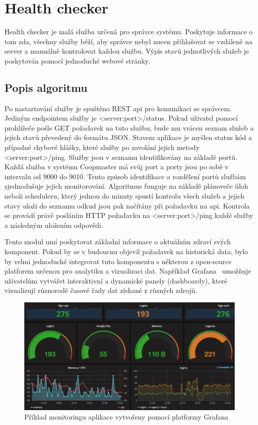 \usepackage{graphicx}\section{Health checker}\label{sec:health-checker}
Health checker je malá služba určená pro správce systému.
Poskytuje informace o tom zda, všechny služby běží, aby správce nebyl nucen přihlašovat se vzdáleně na server a manuálně kontrolovat každou službu.
Výpis stavů jednotlivých služeb je poskytován pomocí jednoduché webové stránky.

\subsection*{Popis algoritmu}
Po nastartování služby je spuštěno REST api pro komunikaci se správcem.
Jediným endpointem služby je <server:port>/status.
Pokud uživatel pomocí prohlížeče pošle GET požadavek na tuto službu, bude mu vrácen seznam služeb a jejich stavů převedený do formátu JSON.
Stavem aplikace je myšlen status kód a případné chybové hlášky, které služby po zavolání jejich metody <server:port>/ping.
Služby jsou v seznamu identifikovány na základě portů.
Každá služba v systému Coopmaster má svůj port a porty jsou po sobě v intervalu od 9000 do 9010.
Tento způsob identifikace a rozdělení portů službám zjednodušuje jejich monitorování.
Algoritmus funguje na základě plánoveče úloh neboli scheduleru, který jednou do minuty spustí kontrolu všech služeb a jejich stavy uloží do seznamu odkud jsou pak načítány při požadavku na api.
Kontrola se provádí právě posláním HTTP požadavku na <server:port>/ping každé služby a následným uložením odpovědi.

Tento modul umí poskytovat základní informace o aktuálním zdraví svých komponent.
Pokud by se v budoucnu objevil požadavek na historická data, bylo by velmi jednoduché integrovat tuto komponentu s některou z open-source platforem určenou pro analytiku a vizualizaci dat.
Například Grafana~\cite{grafana} umožňuje uživatelům vytvářet interaktivní a dynamické panely (dashboardy), které vizualizují různorodé časové řady dat získané z různých zdrojů.


\begin{figure}[h]
    \centering
    \includegraphics[width=\textwidth]{img/health-checker-grafana-dashboard}
    \caption{Příklad monitoringu aplikace vytvořeny pomocí platformy Grafana}
    \label{fig:health-checker-grafana-dashboard}
\end{figure}



